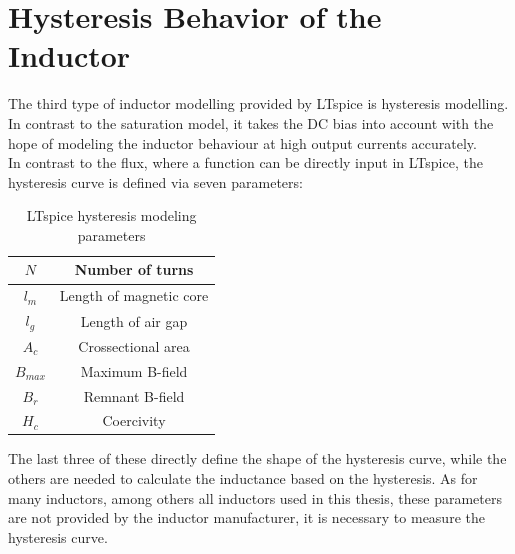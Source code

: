 \newpage
\section{Hysteresis Behavior of the Inductor} \label{sec:hysteresis_behaviour_of_the_inductor}
The third type of inductor modelling provided by LTspice is hysteresis modelling. In contrast to the saturation model, it takes the \ac{DC} bias into account with the hope of modeling the inductor behaviour at high output currents accurately.\\
In contrast to the flux, where a function can be directly input in LTspice, the hysteresis curve is defined via seven parameters: 
\begin{table}[H]
    \centering
    \caption{LTspice hysteresis modeling parameters}
    \begin{tabular}{|c|c|}
        \hline
        $N$ & Number of turns\\
        \hline
        $l_m$ & Length of magnetic core\\
        \hline
        $l_g$ & Length of air gap\\
        \hline
        $A_c$ & Crossectional area \\
        \hline
        $B_{max}$ & Maximum B-field\\
        \hline
        $B_r$ & Remnant B-field\\
        \hline
        $H_c$ & Coercivity\\
        \hline
    \end{tabular}
    \label{tab:ltspice_hystersis_modling_parameters}
\end{table}
 The last three of these directly define the shape of the hysteresis curve, while the others are needed to calculate the inductance based on the hysteresis. As for many inductors, among others all inductors used in this thesis, these parameters are not provided by the inductor manufacturer, it is necessary to measure the hysteresis curve.
